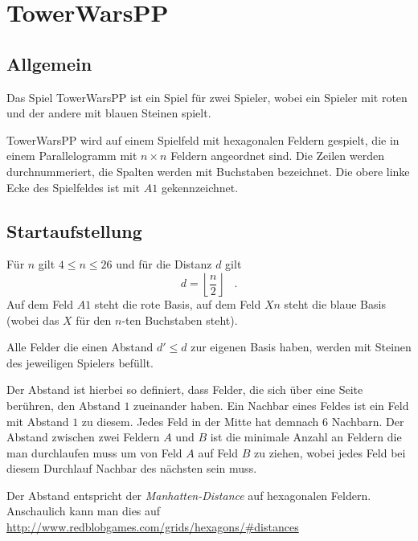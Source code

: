 \section*{TowerWarsPP}
\newcommand{\myAlph}[1]{\char\numexpr`A-1+#1\relax}
\newcommand{\myalph}[1]{\char\numexpr`a-1+#1\relax}

\subsection*{Allgemein}
Das Spiel TowerWarsPP ist ein Spiel für zwei Spieler, wobei ein Spieler mit roten und der andere mit blauen Steinen spielt.

TowerWarsPP wird auf einem Spielfeld mit hexagonalen Feldern gespielt, die in einem Parallelogramm mit $n \times n$ Feldern angeordnet sind. Die Zeilen werden durchnummeriert, die Spalten werden mit Buchstaben bezeichnet. Die obere linke Ecke des Spielfeldes ist mit $A1$ gekennzeichnet.

\subsection*{Startaufstellung}
Für $n$ gilt $4 \le n \le 26$ und für die Distanz $d$ gilt 
\[d = \left\lfloor \frac{n}{2}\right\rfloor\hspace{10pt}.\] 
Auf dem Feld $A1$ steht die rote Basis, auf dem Feld $Xn$ steht die blaue Basis (wobei das $X$ für den $n$-ten Buchstaben steht). 

Alle Felder die einen Abstand $d' \le d$ zur eigenen Basis haben, werden mit Steinen des jeweiligen Spielers befüllt. 


Der Abstand ist hierbei so definiert, dass Felder, die sich über eine Seite berühren, den Abstand $1$ zueinander haben. Ein Nachbar eines Feldes ist ein Feld mit Abstand $1$ zu diesem. Jedes Feld in der Mitte hat demnach $6$ Nachbarn. Der Abstand zwischen zwei Feldern $A$ und $B$ ist die minimale Anzahl an Feldern die man durchlaufen muss um von Feld $A$ auf Feld $B$ zu ziehen, wobei jedes Feld bei diesem Durchlauf Nachbar des nächsten sein muss.

Der Abstand entspricht der \textit{Manhatten-Distance} auf hexagonalen Feldern. Anschaulich kann man dies auf \href{http://www.redblobgames.com/grids/hexagons/#distances}{http://www.redblobgames.com/grids/hexagons/\#distances}

